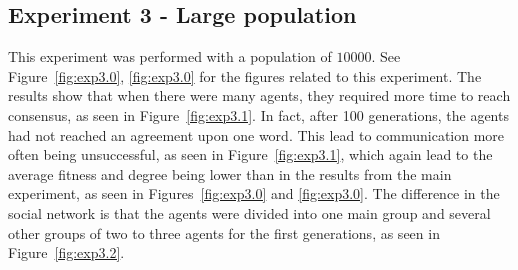 \clearpage
\subsection{Experiment 3 - Large population}
This experiment was performed with a population of $10000$. See Figure~\ref{fig:exp3.0}, \ref{fig:exp3.0} for the figures related to this experiment. The results show that when there were many agents, they required more time to reach consensus, as seen in Figure~\ref{fig:exp3.1}. In fact, after 100 generations, the agents had not reached an agreement upon one word. This lead to communication more often being unsuccessful, as seen in Figure~\ref{fig:exp3.1}, which again lead to the average fitness and degree being lower than in the results from the main experiment, as seen in Figures~\ref{fig:exp3.0} and \ref{fig:exp3.0}. The difference in the social network is that the agents were divided into one main group and several other groups of two to three agents for the first generations, as seen in Figure~\ref{fig:exp3.2}.

